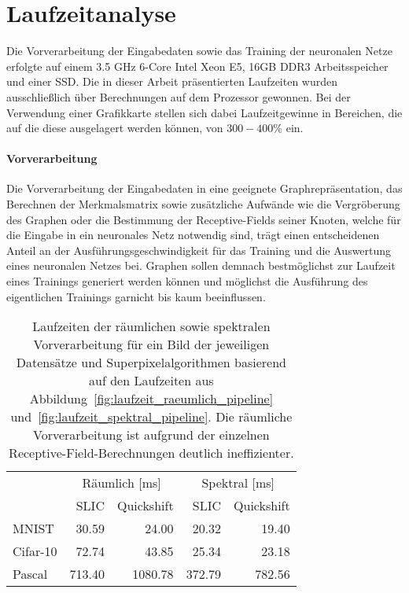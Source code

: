 \section{Laufzeitanalyse}
\label{laufzeitanalyse}

Die Vorverarbeitung der Eingabedaten sowie das Training der neuronalen Netze erfolgte auf einem 3.5 GHz 6-Core Intel Xeon E5, 16GB DDR3 Arbeitsspeicher und einer \gls{SSD}.
Die in dieser Arbeit präsentierten Laufzeiten wurden ausschließlich über Berechnungen auf dem Prozessor gewonnen.
Bei der Verwendung einer Grafikkarte stellen sich dabei Laufzeitgewinne in Bereichen, die auf die diese ausgelagert werden können, von $300 - 400 \%$ ein.

\paragraph{Vorverarbeitung}

Die Vorverarbeitung der Eingabedaten in eine geeignete Graphrepräsentation, das Berechnen der Merkmalsmatrix sowie zusätzliche Aufwände wie die Vergröberung des Graphen oder die Bestimmung der Receptive-Fields seiner Knoten, welche für die Eingabe in ein neuronales Netz notwendig sind, trägt einen entscheidenen Anteil an der Ausführungsgeschwindigkeit für das Training und die Auswertung eines neuronalen Netzes bei.
Graphen sollen demnach bestmöglichst zur Laufzeit eines Trainings generiert werden können und möglichst die Ausführung des eigentlichen Trainings garnicht bis kaum beeinflussen.




\begin{table}[t]
\centering
\begin{tabular}{lrrrr}
  \toprule
  & \multicolumn{2}{c}{Räumlich [ms]} & \multicolumn{2}{c}{Spektral [ms]}\\
  \cmidrule{2-5}
  & \acs{SLIC} & Quickshift & \acs{SLIC} & Quickshift\\
  \midrule
  \acs{MNIST} & 30.59 & 24.00 & 20.32 & 19.40\\
  \acs{Cifar}-10 & 72.74 & 43.85 & 25.34 & 23.18\\
  \acs{Pascal} & 713.40 & 1080.78 & 372.79 & 782.56\\
  \bottomrule
\end{tabular}
\caption[Laufzeiten der räumlichen und spektralen Vorverarbeitung]{Laufzeiten der räumlichen sowie spektralen Vorverarbeitung für ein Bild der jeweiligen Datensätze und Superpixelalgorithmen basierend auf den Laufzeiten aus Abbildung~\ref{fig:laufzeit_raeumlich_pipeline} und~\ref{fig:laufzeit_spektral_pipeline}.
Die räumliche Vorverarbeitung ist aufgrund der einzelnen Receptive-Field-Berechnungen deutlich ineffizienter.}
\label{tab:laufzeit_raeumlich_spektral}
\end{table}

